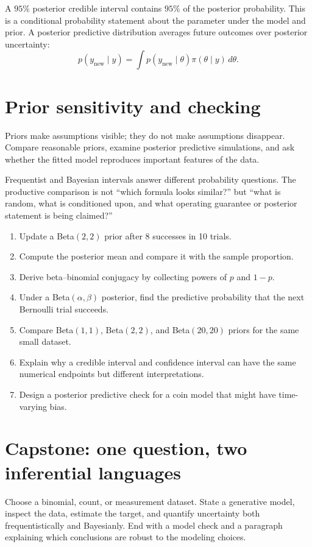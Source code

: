 A $95\%$ posterior credible interval contains $95\%$ of the posterior probability. This is a conditional probability statement about the parameter under the model and prior. A posterior predictive distribution averages future outcomes over posterior uncertainty:
\[
p(y_{\mathrm{new}}\mid y)=\int p(y_{\mathrm{new}}\mid\theta)\pi(\theta\mid y)\,d\theta.
\]

\section{Prior sensitivity and checking}

Priors make assumptions visible; they do not make assumptions disappear. Compare reasonable priors, examine posterior predictive simulations, and ask whether the fitted model reproduces important features of the data.

\begin{bigidea}
Frequentist and Bayesian intervals answer different probability questions. The productive comparison is not ``which formula looks similar?'' but ``what is random, what is conditioned upon, and what operating guarantee or posterior statement is being claimed?''
\end{bigidea}

\begin{exercisebox}
\begin{enumerate}
  \item Update a Beta$(2,2)$ prior after 8 successes in 10 trials. 
  \item Compute the posterior mean and compare it with the sample proportion. 
  \item Derive beta--binomial conjugacy by collecting powers of $p$ and $1-p$. 
  \item Under a Beta$(\alpha,\beta)$ posterior, find the predictive probability that the next Bernoulli trial succeeds. 
  \item Compare Beta$(1,1)$, Beta$(2,2)$, and Beta$(20,20)$ priors for the same small dataset. 
  \item Explain why a credible interval and confidence interval can have the same numerical endpoints but different interpretations. 
  \item Design a posterior predictive check for a coin model that might have time-varying bias. 
\end{enumerate}
\end{exercisebox}

\section*{Capstone: one question, two inferential languages}

Choose a binomial, count, or measurement dataset. State a generative model, inspect the data, estimate the target, and quantify uncertainty both frequentistically and Bayesianly. End with a model check and a paragraph explaining which conclusions are robust to the modeling choices.
